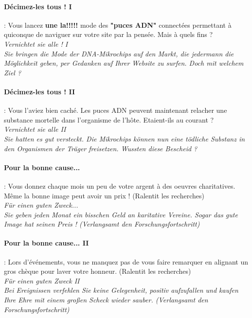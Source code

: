 \documentclass[10pt,a4paper]{article}
\begin{document}
\paragraph{Décimez-les tous ! I} : Vous lancez \textbf{une la!!!!!} mode des \textbf{"puces ADN"} connectées permettant à quiconque de naviguer sur votre site par la pensée. Mais à quels fins ?\\
\textit{Vernichtet sie alle ! I}\\
\textit{Sie bringen die Mode der DNA-Mikrochips auf den Markt, die jedermann die Möglichkeit geben, per Gedanken auf Ihrer Website zu surfen. Doch mit welchem Ziel ?}


\paragraph{Décimez-les tous ! II} : Vous l'aviez bien caché. Les puces ADN peuvent maintenant relacher une substance mortelle dans l'organisme de l'hôte. Etaient-ils au courant ?\\
\textit{Vernichtet sie alle II}\\
\textit{Sie hatten es gut versteckt. Die Mikrochips können nun eine tödliche Substanz in den Organismen der Träger freisetzen. Wussten diese Bescheid ?}


\paragraph{Pour la bonne cause...} : Vous donnez chaque mois un peu de votre argent à des oeuvres charitatives. Même la bonne image peut avoir un prix ! (Ralentit les recherches)\\
\textit{Für einen guten Zweck...}\\
\textit{Sie geben jeden Monat ein bisschen Geld an karitative Vereine. Sogar das gute Image hat seinen Preis ! (Verlangsamt den Forschungsfortschritt)}


\paragraph{Pour la bonne cause... II} : Lors d'événements, vous ne manquez pas de vous faire remarquer en alignant un gros chèque pour laver votre honneur. (Ralentit les recherches)\\
\textit{Für einen guten Zweck II}\\
\textit{Bei Ereignissen verfehlen Sie keine Gelegenheit, positiv aufzufallen und kaufen Ihre Ehre mit einem großen Scheck wieder sauber. (Verlangsamt den Forschungsfortschritt)}
\end{document}
